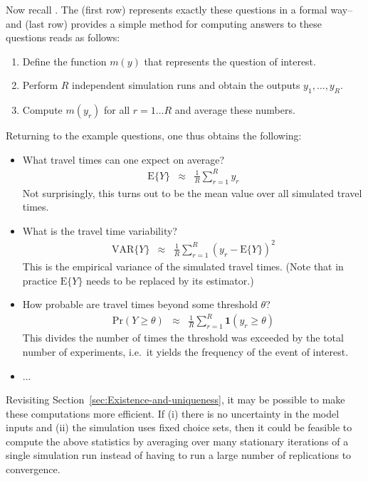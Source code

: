 Now recall .
The  (first row) represents exactly these questions
in a formal way--and  (last row) provides a
simple method for computing answers to these questions reads
as follows:
\begin{enumerate}
\item Define the function $m(y)$ that represents the question of interest.
\item Perform $R$ independent simulation runs and obtain the outputs $y_{1},\ldots,y_{R}$.
\item Compute $m(y_{r})$ for all $r=1\ldots R$ and average these numbers.
\end{enumerate}
Returning to the example questions, one thus obtains the following:
\begin{itemize}
\item What travel times can one expect on average?
\begin{eqnarray}
\text{E}\{Y\} & \approx & \frac{1}{R}\sum_{r=1}^{R}y_{r}
\end{eqnarray}
Not surprisingly, this turns out to be the mean value over all simulated
travel times.
\item What is the travel time variability?
\begin{eqnarray}
\text{VAR}\{Y\} & \approx & \frac{1}{R}\sum_{r=1}^{R}(y_{r}-\text{E}\{Y\})^{2}
\end{eqnarray}
This is the empirical variance of the simulated travel times. (Note
that in practice $\text{E}\{Y\}$ needs to be replaced by its estimator.)
\item How probable are travel times beyond some threshold $\theta$?
\begin{eqnarray}
\text{Pr}(Y\geq\theta) & \approx & \frac{1}{R}\sum_{r=1}^{R}\mathbf{1}(y_{r}\geq\theta)
\end{eqnarray}
This divides the number of times the threshold was exceeded by the
total number of experiments, i.e.\ it yields the frequency of the event
of interest.
\item ...
\end{itemize}
Revisiting Section~\ref{sec:Existence-and-uniqueness}, it may
be possible to make these computations more efficient. If (i) there
is no uncertainty in the model inputs and (ii) the simulation uses
fixed choice sets, then it could be feasible to compute the above
statistics by averaging over many stationary iterations of a single
simulation run\corr{,}{} instead of having to run a large number of replications
to convergence. 


